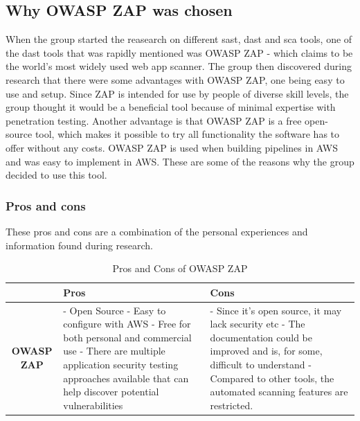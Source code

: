 \subsection{Why OWASP ZAP was chosen}
When the group started the reasearch on different \acrshort{sast}, \acrshort{dast} and \acrshort{sca} tools, one of the \acrshort{dast} tools that was rapidly mentioned was OWASP ZAP - which claims to be the world's most widely used web app scanner. 
The group then discovered during research that there were some advantages with OWASP ZAP, one being easy to use and setup. Since ZAP is intended for use by people of diverse skill levels, the group thought it would be a beneficial tool because of minimal expertise with penetration testing. Another advantage is that OWASP ZAP is a free open-source tool, which makes it possible to try all functionality the software has to offer without any costs. OWASP ZAP is used when building pipelines in AWS and was easy to implement in AWS. These are some of the reasons why the group decided to use this tool. 

\subsubsection{Pros and cons}
These pros and cons are a combination of the personal experiences and information found during research.\cite{prosconsZAP}
\begin{table}[H]
\centering
\begin{tabular}{|c|p{6cm}|p{6cm}|}
\hline
 & \textbf{Pros} & \textbf{Cons} \\
\hline
\textbf{OWASP ZAP} & 
- Open Source \newline
- Easy to configure with AWS\newline
- Free for both personal and commercial use \newline
- There are multiple application security testing approaches available that can help discover potential vulnerabilities &

- Since it's open source, it may lack security etc \newline
- The documentation could be improved and is, for some, difficult to understand\newline
- Compared to other tools, the automated scanning features are restricted. \newline
 \\
\hline
\end{tabular}
\caption{Pros and Cons of OWASP ZAP}
\label{tab:dependabot}
\end{table}


